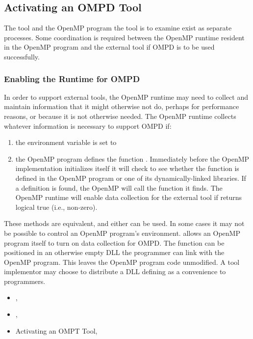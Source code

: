 \subsection{Activating an OMPD Tool}
\label{sec:ompd:activating}

The tool and the OpenMP program the tool is to examine
exist as separate processes.
Some coordination is required between the OpenMP runtime resident
in the OpenMP program and the external tool if OMPD is to be used
successfully.

\subsubsection{Enabling the Runtime for OMPD}
\label{sec:ompd:enabling-ompd}

In order to support external tools, the OpenMP runtime may need to collect
and maintain information that it might otherwise not do, perhaps
for performance reasons, or because it is not otherwise needed.
The OpenMP runtime collects whatever information is necessary
to support OMPD if:
\begin{enumerate}
\item
  the environment variable  is set to 
\item
  the OpenMP program defines the function
  .
  Immediately before the OpenMP implementation initializes itself
  it will check to see whether the  function
  is defined in the OpenMP program or one of its dynamically-linked libraries.
  If a definition is found, the OpenMP will call the function it finds.
  The OpenMP runtime will enable data collection for the external tool
  if  returns logical true (i.e., non-zero).
\end{enumerate}
These methods are equivalent, and either can be used.
In some cases it may not be possible to control an OpenMP program's
environment.
 allows an OpenMP program itself to turn on
data collection for OMPD.
The function can be positioned in an otherwise empty DLL the
programmer can link with the OpenMP program.
This leaves the OpenMP program code unmodified.
A tool implementor may choose to distribute a DLL defining
 as a convenience to programmers.

\crossreferences
\begin{itemize}
\item
  , 
\item
  , 
\item
  Activating an OMPT Tool, 
\end{itemize}

